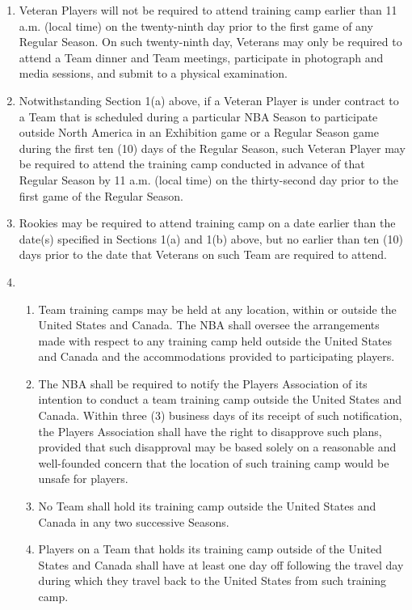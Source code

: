 \documentclass[
]{book}
\providecommand{\tightlist}{%
  \setlength{\itemsep}{0pt}\setlength{\parskip}{0pt}}
\begin{document}
\begin{enumerate}
\def\labelenumi{(\alph{enumi})}
\item
  Veteran Players will not be required to attend training camp earlier than 11 a.m. (local time) on the twenty-ninth day prior to the first game of any Regular Season. On such twenty-ninth day, Veterans may only be required to attend a Team dinner and Team meetings, participate in photograph and media sessions, and submit to a physical examination.
\item
  Notwithstanding Section 1(a) above, if a Veteran Player is under contract to a Team that is scheduled during a particular NBA Season to participate outside North America in an Exhibition game or a Regular Season game during the first ten (10) days of the Regular Season, such Veteran Player may be required to attend the training camp conducted in advance of that Regular Season by 11 a.m. (local time) on the thirty-second day prior to the first game of the Regular Season.
\item
  Rookies may be required to attend training camp on a date earlier than the date(s) specified in Sections 1(a) and 1(b) above, but no earlier than ten (10) days prior to the date that Veterans on such Team are required to attend.
\item
  \begin{enumerate}
  \def\labelenumii{(\roman{enumii})}
  \tightlist
  \item
    Team training camps may be held at any location, within or outside the United States and Canada. The NBA shall oversee the arrangements made with respect to any training camp held outside the United States and Canada and the accommodations provided to participating players.
  \item
    The NBA shall be required to notify the Players Association of its intention to conduct a team training camp outside the United States and Canada. Within three (3) business days of its receipt of such notification, the Players Association shall have the right to disapprove such plans, provided that such disapproval may be based solely on a reasonable and well-founded concern that the location of such training camp would be unsafe for players.
  \item
    No Team shall hold its training camp outside the United States and Canada in any two successive Seasons.
  \item
    Players on a Team that holds its training camp outside of the United States and Canada shall have at least one day off following the travel day during which they travel back to the United States from such training camp.

\end{enumerate}
\end{enumerate}
\end{document}

